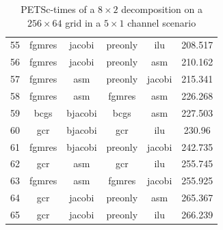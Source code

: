 \begin{table}[h]
\begin{tabular}{cccccc}
    55 & fgmres & jacobi & preonly & ilu & 208.517 \\
    56 & fgmres & jacobi & preonly & asm & 210.162 \\
    57 & fgmres & asm & preonly & jacobi & 215.341 \\
    58 & fgmres & asm & fgmres & asm & 226.268 \\
    59 & bcgs & bjacobi & bcgs & asm & 227.503 \\
    60 & gcr & bjacobi & gcr & ilu & 230.96 \\
    61 & fgmres & bjacobi & preonly & jacobi & 242.735 \\
    62 & gcr & asm & gcr & ilu & 255.745 \\
    63 & fgmres & asm & fgmres & jacobi & 255.925 \\
    64 & gcr & jacobi & preonly & asm & 265.367 \\
    65 & gcr & jacobi & preonly & ilu & 266.239 \\
    \hline
  \end{tabular}
  \caption{PETSc-times of a $8 \times 2$ decomposition on a $256 \times 64$ grid in a $5 \times 1$ channel scenario}
  \label{fig:petsc-opt-combinations-8x2}
\end{table}

